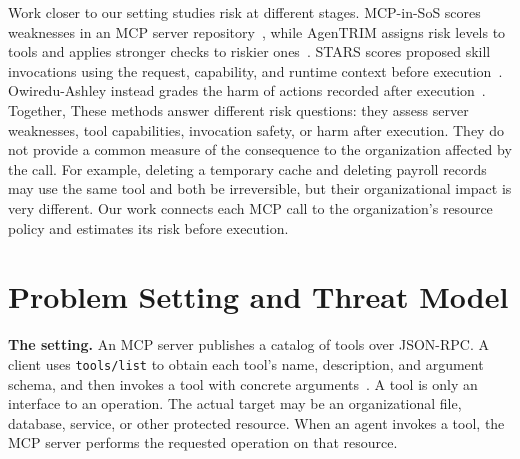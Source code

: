 \documentclass[sigconf]{acmart}
\begin{document}
Work closer to our setting studies risk at different stages. MCP-in-SoS scores
weaknesses in an MCP server repository~\cite{kumar2026mcpinsos}, while
AgenTRIM assigns risk levels to tools and applies stronger checks to riskier
ones~\cite{betser2026agentrim}. STARS scores proposed skill invocations using
the request, capability, and runtime context before
execution~\cite{zhang2026stars}. Owiredu-Ashley instead grades the harm of
actions recorded after execution~\cite{owireduashley2026severity}. Together,
These methods answer different risk questions: they assess server weaknesses,
tool capabilities, invocation safety, or harm after execution. They do not
provide a common measure of the consequence to the organization affected by
the call. For example, deleting a temporary cache and deleting payroll records
may use the same tool and both be irreversible, but their organizational impact
is very different. Our work connects each MCP call to the organization’s
resource policy and estimates its risk before execution.

%
%
%
%
%
\section{Problem Setting and Threat Model}
\label{sec:threat}

\textbf{The setting.}
An MCP server publishes a catalog of tools over JSON-RPC. A client uses
\texttt{tools/list} to obtain each tool's name, description, and argument
schema, and then invokes a tool with concrete
arguments~\cite{anthropic2024mcp,mcp2026spec}. A tool is only an interface to
an operation. The actual target may be an organizational file, database,
service, or other protected resource. When an agent invokes a tool, the MCP
server performs the requested operation on that resource.
\end{document}
